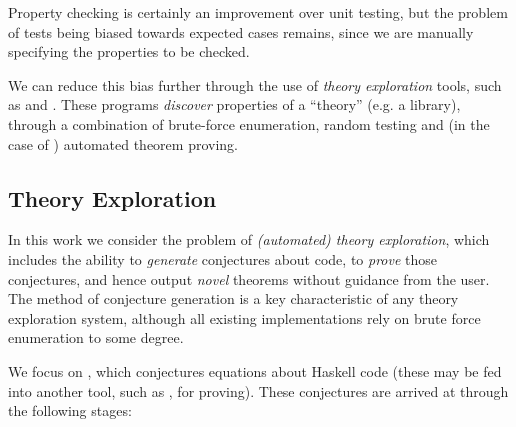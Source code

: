Property checking is certainly an improvement over unit testing, but the problem of tests being biased towards expected cases remains, since we are manually specifying the properties to be checked.

We can reduce this bias further through the use of \emph{theory exploration} tools, such as \qspec{} and \hspec{}. These programs \emph{discover} properties of a ``theory'' (e.g. a library), through a combination of brute-force enumeration, random testing and (in the case of \hspec{}) automated theorem proving.

\subsection{Theory Exploration}
\label{sec:theoryexploration}

In this work we consider the problem of \emph{(automated) theory exploration}, which includes the ability to \emph{generate} conjectures about code, to \emph{prove} those conjectures, and hence output \emph{novel} theorems without guidance from the user. The method of conjecture generation is a key characteristic of any theory exploration system, although all existing implementations rely on brute force enumeration to some degree.

We focus on \qspec{} \citep{QuickSpec}, which conjectures equations about Haskell code (these may be fed into another tool, such as \hspec{}, for proving). These conjectures are arrived at through the following stages:

\iffalse TODO: Make this more formal?
 V \in Var
 F \in Fun
 T \in Term
 T ::= V | F | T1 T2

 Term ::= VAR | Const | Fun (Term)
or
 Term t ::= x | f | t t'
\fi

